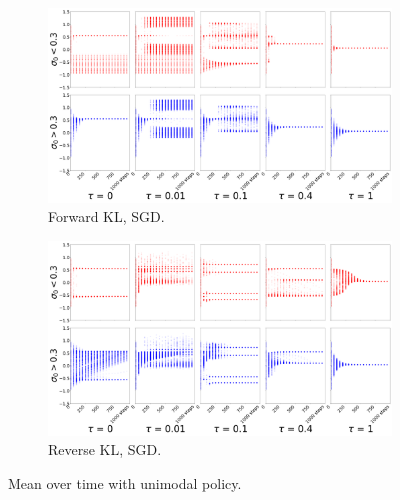 \documentclass{article}
\begin{document}
\begin{figure}[!ht]
  \begin{subfigure}[b]{0.4\linewidth}
    \centering
    \includegraphics[width=1\columnwidth]{figs/bandit/notlearnQ/modes=1/sgd/mean_forward_optim=sgd_modes=1_lr=0.01.png}
    \caption{Forward KL, SGD.}
    \label{fig:bandit-mean-forward-sgd}
  \end{subfigure}%
  \begin{subfigure}[b]{0.4\linewidth}
    \centering
    \includegraphics[width=1\columnwidth]{figs/bandit/notlearnQ/modes=1/sgd/mean_reverse_optim=sgd_modes=1_lr=0.01.png}
    \caption{Reverse KL, SGD.}
    \label{fig:bandit-mean-reverse-sgd}
  \end{subfigure}
  \caption{Mean over time with unimodal policy. }
\end{figure}
\end{document}
